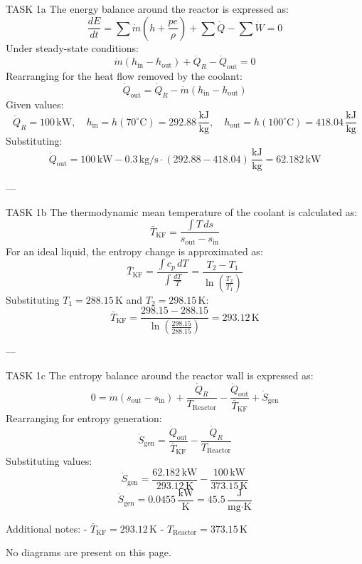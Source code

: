 TASK 1a  
The energy balance around the reactor is expressed as:  
\[
\frac{dE}{dt} = \sum \dot{m} (h + \frac{pe}{\rho}) + \sum \dot{Q} - \sum \dot{W} = 0
\]  
Under steady-state conditions:  
\[
\dot{m} (h_{\text{in}} - h_{\text{out}}) + \dot{Q}_R - \dot{Q}_{\text{out}} = 0
\]  
Rearranging for the heat flow removed by the coolant:  
\[
\dot{Q}_{\text{out}} = \dot{Q}_R - \dot{m} (h_{\text{in}} - h_{\text{out}})
\]  
Given values:  
\[
\dot{Q}_R = 100 \, \text{kW}, \quad h_{\text{in}} = h(70^\circ\text{C}) = 292.88 \, \frac{\text{kJ}}{\text{kg}}, \quad h_{\text{out}} = h(100^\circ\text{C}) = 418.04 \, \frac{\text{kJ}}{\text{kg}}
\]  
Substituting:  
\[
\dot{Q}_{\text{out}} = 100 \, \text{kW} - 0.3 \, \text{kg/s} \cdot (292.88 - 418.04) \, \frac{\text{kJ}}{\text{kg}} = 62.182 \, \text{kW}
\]  

---

TASK 1b  
The thermodynamic mean temperature of the coolant is calculated as:  
\[
\bar{T}_{\text{KF}} = \frac{\int T \, ds}{s_{\text{out}} - s_{\text{in}}}
\]  
For an ideal liquid, the entropy change is approximated as:  
\[
\bar{T}_{\text{KF}} = \frac{\int c_p \, dT}{\int \frac{dT}{T}} = \frac{T_2 - T_1}{\ln \left( \frac{T_2}{T_1} \right)}
\]  
Substituting \( T_1 = 288.15 \, \text{K} \) and \( T_2 = 298.15 \, \text{K} \):  
\[
\bar{T}_{\text{KF}} = \frac{298.15 - 288.15}{\ln \left( \frac{298.15}{288.15} \right)} = 293.12 \, \text{K}
\]  

---

TASK 1c  
The entropy balance around the reactor wall is expressed as:  
\[
0 = \dot{m} (s_{\text{out}} - s_{\text{in}}) + \frac{\dot{Q}_R}{T_{\text{Reactor}}} - \frac{\dot{Q}_{\text{out}}}{\bar{T}_{\text{KF}}} + \dot{S}_{\text{gen}}
\]  
Rearranging for entropy generation:  
\[
\dot{S}_{\text{gen}} = \frac{\dot{Q}_{\text{out}}}{\bar{T}_{\text{KF}}} - \frac{\dot{Q}_R}{T_{\text{Reactor}}}
\]  
Substituting values:  
\[
\dot{S}_{\text{gen}} = \frac{62.182 \, \text{kW}}{293.12 \, \text{K}} - \frac{100 \, \text{kW}}{373.15 \, \text{K}}
\]  
\[
\dot{S}_{\text{gen}} = 0.0455 \, \frac{\text{kW}}{\text{K}} = 45.5 \, \frac{\text{J}}{\text{mg·K}}
\]  

Additional notes:  
- \( \bar{T}_{\text{KF}} = 293.12 \, \text{K} \)  
- \( T_{\text{Reactor}} = 373.15 \, \text{K} \)  

No diagrams are present on this page.
